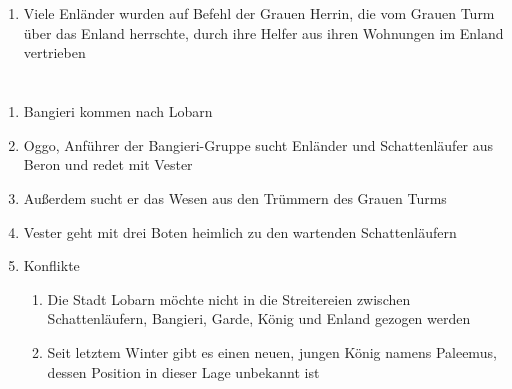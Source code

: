 \documentclass[12pt,a4paper,onecolumn,twoside,ngerman]{book}
\newcommand{\Beron}{Beron}
\newcommand{\Garde}{Garde}
\newcommand{\Bangiri}{Bangieri}
\newcommand{\Oggo}{Oggo}
\newcommand{\Enland}{Enland}
\newcommand{\Enlaender}{Enländer}
\newcommand{\Schattenlaufer}{Schattenläufer}
\newcommand{\Lobarn}{Lobarn}
\newcommand{\Vester}{Vester}
\newcommand{\Naimo}{Naimo}
\newcommand{\Palemus}{Paleemus}
\begin{document}
\section[{\Naimo} erzählt die traurige Geschichte der Grauen Herrin und wie das {\Enland} verloren wurde]{}
\begin{enumerate}
  \item Viele {\Enlaender} wurden auf Befehl der Grauen Herrin, die vom Grauen Turm über das {\Enland} herrschte, durch ihre Helfer aus ihren Wohnungen im {\Enland} vertrieben
\end{enumerate}

\section[Die {\Bangiri} kommen]{}
\begin{enumerate}
  \item {\Bangiri} kommen nach {\Lobarn}
  \item {\Oggo}, Anführer der {\Bangiri}-Gruppe sucht {\Enlaender} und {\Schattenlaufer} aus {\Beron} und redet mit {\Vester}
  \item Außerdem sucht er das Wesen aus den Trümmern des Grauen Turms
  \item {\Vester} geht mit drei Boten heimlich zu den wartenden {\Schattenlaufer}n
  \item Konflikte
  \begin{enumerate}
    \item Die Stadt {\Lobarn} möchte nicht in die Streitereien zwischen {\Schattenlaufer}n, {\Bangiri}, {\Garde}, König und {\Enland} gezogen werden
    \item Seit letztem Winter gibt es einen neuen, jungen König namens {\Palemus}, dessen Position in dieser Lage unbekannt ist
  \end{enumerate}
\end{enumerate}
\end{document}
